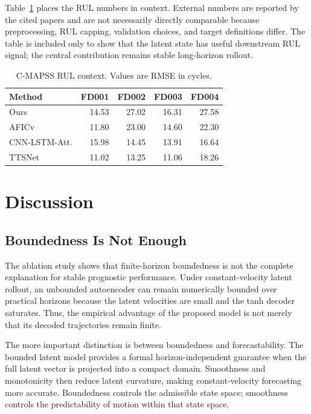 \documentclass[a4paper,fleqn]{cas-sc}
\newcommand{\tinytable}{\scriptsize}
\newcommand{\verytighttables}{%
  \setlength{\tabcolsep}{3.5pt}%
  \renewcommand{\arraystretch}{1.05}%
}
\begin{document}
Table~\ref{tab:rul-literature} places the RUL numbers in context. External
numbers are reported by the cited papers and are not necessarily directly
comparable because preprocessing, RUL capping, validation choices, and target
definitions differ. The table is included only to show that the latent state
has useful downstream RUL signal; the central contribution remains stable
long-horizon rollout.

\begin{table}[t]
\centering
\caption{C-MAPSS RUL context. Values are RMSE in cycles.}
\label{tab:rul-literature}
\tinytable
\verytighttables
\begin{tabular}{@{}lrrrr@{}}
\toprule
Method & FD001 & FD002 & FD003 & FD004 \\
\midrule
Ours & 14.53 & 27.02 & 16.31 & 27.58 \\
AFICv \citep{alomari2023aficv} & 11.80 & 23.00 & 14.60 & 22.30 \\
CNN-LSTM-Att. \citep{deng2024cnnlstmattention} & 15.98 & 14.45 & 13.91 & 16.64 \\
TTSNet \citep{li2025ttsnet} & 11.02 & 13.25 & 11.06 & 18.26 \\
\bottomrule
\end{tabular}
\end{table}

\section{Discussion}
\label{sec:discussion}

\subsection{Boundedness Is Not Enough}

The ablation study shows that finite-horizon boundedness is not the complete
explanation for stable prognostic performance. Under constant-velocity latent
rollout, an unbounded autoencoder can remain numerically bounded over
practical horizons because the latent velocities are small and the tanh decoder
saturates. Thus, the empirical advantage of the proposed model is not merely
that its decoded trajectories remain finite.

The more important distinction is between boundedness and forecastability. The
bounded latent model provides a formal horizon-independent guarantee when the
full latent vector is projected into a compact domain. Smoothness and
monotonicity then reduce latent curvature, making constant-velocity forecasting
more accurate. Boundedness controls the admissible state space; smoothness
controls the predictability of motion within that state space.
\end{document}
